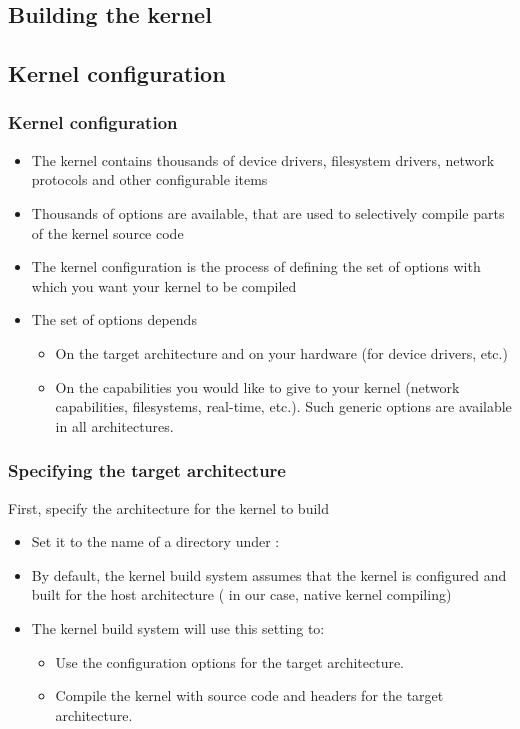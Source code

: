 \subsection{Building the kernel}

\subsection{Kernel configuration}

\begin{frame}
  \frametitle{Kernel configuration}
  \begin{itemize}
  \item The kernel contains thousands of device drivers, filesystem
    drivers, network protocols and other configurable items
  \item Thousands of options are available, that are used to
    selectively compile parts of the kernel source code
  \item The kernel configuration is the process of defining the set of
    options with which you want your kernel to be compiled
  \item The set of options depends
    \begin{itemize}
    \item On the target architecture and on your hardware (for device drivers, etc.)
    \item On the capabilities you would like to give to your kernel
      (network capabilities, filesystems, real-time, etc.).
      Such generic options are available in all architectures.
    \end{itemize}
  \end{itemize}
\end{frame}

\begin{frame}
  \frametitle{Specifying the target architecture}
  First, specify the architecture for the kernel to build
  \begin{itemize}
  \item Set it to the name of a directory under :\\
  \item By default, the kernel build system assumes that the
        kernel is configured and built for the host architecture
	( in our case, native kernel compiling)
  \item The kernel build system will use this setting to:
  	\begin{itemize}
	\item Use the configuration options for the target
	      architecture.
	\item Compile the kernel with source code and headers
	      for the target architecture.
	\end{itemize}
  \end{itemize}
\end{frame}

